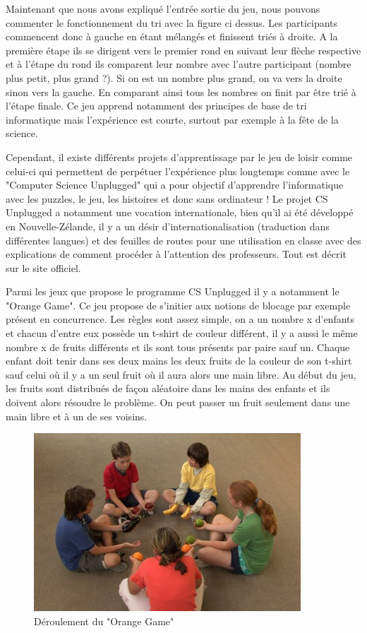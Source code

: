 Maintenant que nous avons expliqué l'entrée sortie du jeu, nous pouvons commenter le fonctionnement du tri avec la figure ci dessus. Les participants commencent donc à gauche en étant mélangés et finissent triés à droite. A la première étape ils se dirigent vers le premier rond en suivant leur flèche respective et à l'étape du rond ils comparent leur nombre avec l'autre participant (nombre plus petit, plus grand ?). Si on est un nombre plus grand, on va vers la droite sinon vers la gauche. En comparant ainsi tous les nombres on finit par être trié à l'étape finale. Ce jeu apprend notamment des principes de base de tri informatique mais l'expérience est courte, surtout par exemple à la fête de la science.

Cependant, il existe différents projets d'apprentissage par le jeu de loisir comme celui-ci qui permettent de perpétuer l'expérience plus longtemps comme avec le "Computer Science Unplugged" qui a pour objectif d'apprendre l'informatique avec les puzzles, le jeu, les histoires et donc sans ordinateur ! \cite{29} Le projet CS Unplugged a notamment une vocation internationale, bien qu'il ai été développé en Nouvelle-Zélande, il y a un désir d'internationalisation (traduction dans différentes langues) et des feuilles de routes pour une utilisation en classe avec des explications de comment procéder à l'attention des professeurs. Tout est décrit sur le site officiel. \cite{30}

\newpage

Parmi les jeux que propose le programme CS Unplugged il y a notamment le "Orange Game". Ce jeu propose de s'initier aux notions de blocage par exemple présent en concurrence. Les règles sont assez simple, on a un nombre x d'enfants et chacun d'entre eux possède un t-shirt de couleur différent, il y a aussi le même nombre x de fruits différents et ils sont tous présents par paire sauf un. Chaque enfant doit tenir dans ses deux mains les deux fruits de la couleur de son t-shirt sauf celui où il y a un seul fruit où il aura alors une main libre. Au début du jeu, les fruits sont distribués de façon aléatoire dans les mains des enfants et ils doivent alors résoudre le problème. On peut passer un fruit seulement dans une main libre et à un de ses voisins.

\begin{figure}[!htb]
  \centering
  \includegraphics[width=100mm,scale=0.5]{images/orange-game.jpg}
  \caption{Déroulement du "Orange Game"}
  \label{fig:boat1}
\end{figure}

